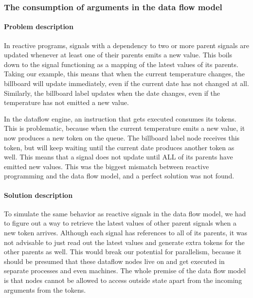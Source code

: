 \subsubsection{The consumption of arguments in the data flow model}

\paragraph{Problem description}

In reactive programs, signals with a dependency to two or more parent signals are updated whenever at least one of their parents emits a new value. This boils down to the signal functioning as a mapping of the latest values of its parents. Taking our example, this means that when the current temperature changes, the billboard will update immediately, even if the current date has not changed at all.
Similarly, the billboard label updates when the date changes, even if the temperature has not emitted a new value.

In the dataflow engine, an instruction that gets executed consumes its tokens. This is problematic, because when the current temperature emits a new value, it now produces a new token on the queue. 
The billboard label node receives this token, but will keep waiting until the current date produces another token as well. This means that a signal does not update until ALL of its parents have emitted new values.
This was the biggest mismatch between reactive programming and the data flow model, and a perfect solution was not found.

\paragraph{Solution description}

To simulate the same behavior as reactive signals in the data flow model, we had to figure out a way to retrieve the latest values of other parent signals when a new token arrives. 
Although each signal has references to all of its parents, it was not advisable to just read out the latest values and generate extra tokens for the other parents as well. 
This would break our potential for parallelism, because it should be presumed that these dataflow nodes live on and get executed in separate processes and even machines.
The whole premise of the data flow model is that nodes cannot be allowed to access outside state apart from the incoming arguments from the tokens.

